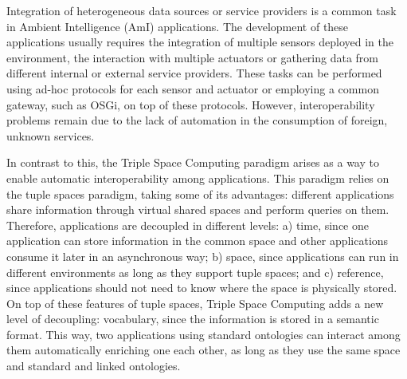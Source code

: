 
Integration of heterogeneous data sources or service providers is a common task in Ambient Intelligence (AmI)
applications. The development of these applications usually requires the integration of multiple sensors deployed
in the environment, the interaction with multiple actuators or gathering data from different internal or external
service providers. These tasks can be performed using ad-hoc protocols for each sensor and actuator or employing
a common gateway, such as OSGi, on top of these protocols. However, interoperability problems remain due to the
lack of automation in the consumption of foreign, unknown services. %

In contrast to this, the Triple Space Computing paradigm arises as a way to enable automatic interoperability
among applications. This paradigm relies on the tuple spaces paradigm, taking some of its advantages: different
applications share information through virtual shared spaces and perform queries on them. Therefore, applications are
decoupled in different levels: a) time, since one application can store information in the common space and other
applications consume it later in an asynchronous way; b) space, since applications can run in different environments as
long as they support tuple spaces; and c) reference, since applications should not need to know where the space is
physically stored. On top of these features of tuple spaces, Triple Space Computing adds a new level of decoupling:
vocabulary, since the information is stored in a semantic format. This way, two applications using standard ontologies
can interact among them automatically enriching one each other, as long as they use the same space and standard and
linked ontologies.


